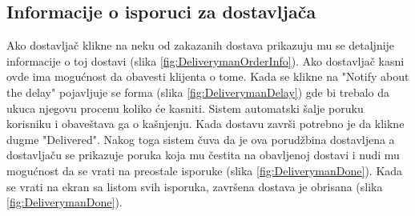 \subsection{Informacije o isporuci za dostavljača}

Ako dostavljač klikne na neku od zakazanih dostava prikazuju mu se detaljnije informacije o toj dostavi (slika \ref{fig:DeliverymanOrderInfo}).
Ako dostavljač kasni ovde ima mogućnost da obavesti klijenta o tome. Kada se klikne na "Notify about the delay" pojavljuje se forma (slika \ref{fig:DeliverymanDelay}) gde bi trebalo da ukuca njegovu procenu koliko će kasniti. Sistem automatski šalje poruku korisniku i obaveštava ga o kašnjenju.
Kada dostavu završi potrebno je da klikne dugme "Delivered". Nakog toga sistem čuva da je ova porudžbina dostavljena a dostavljaču se prikazuje poruka koja mu čestita na obavljenoj dostavi i nudi mu mogućnost da se vrati na preostale isporuke (slika \ref{fig:DeliverymanDone}). Kada se vrati na ekran sa listom svih isporuka, završena dostava je obrisana (slika \ref{fig:DeliverymanDone}).


